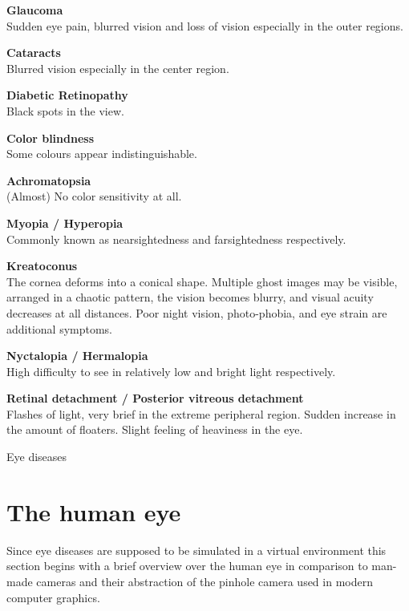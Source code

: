 \documentclass{acm_proc_article-sp}
\begin{document}
\begin{table}
    \textbf{Glaucoma}\\
    Sudden eye pain, blurred vision and loss of vision especially in the
    outer regions.

    \vspace{1em}\textbf{Cataracts}\\
    Blurred vision especially in the center region.

    \vspace{1em}\textbf{Diabetic Retinopathy}\\
    Black spots in the view.

    \vspace{1em}\textbf{Color blindness}\\
    Some colours appear indistinguishable.

    \vspace{1em}\textbf{Achromatopsia}\\
    (Almost) No color sensitivity at all.

    \vspace{1em}\textbf{Myopia / Hyperopia}\\
    Commonly known as nearsightedness and farsightedness respectively.

    \vspace{1em}\textbf{Kreatoconus}\\
    The cornea deforms into a conical shape.
    Multiple ghost images may be visible, arranged in a chaotic pattern,
    the vision becomes blurry, and visual acuity decreases at all distances.
    Poor night vision, photo-phobia, and eye strain are additional symptoms.

    \vspace{1em}\textbf{Nyctalopia / Hermalopia}\\
    High difficulty to see in relatively low and bright light respectively.

    \vspace{1em}\textbf{Retinal detachment / Posterior vitreous detachment}\\
    Flashes of light, very brief in the extreme peripheral region.
    Sudden increase in the amount of floaters.
    Slight feeling of heaviness in the eye.
    \caption{Eye diseases}
    \label{tab:eye_diseases}
\end{table}

\section{The human eye}
Since eye diseases are supposed to be simulated in a virtual environment this section begins with a brief overview over the human eye in comparison to man-made cameras and their abstraction of the pinhole camera used in modern computer graphics.
\end{document}
